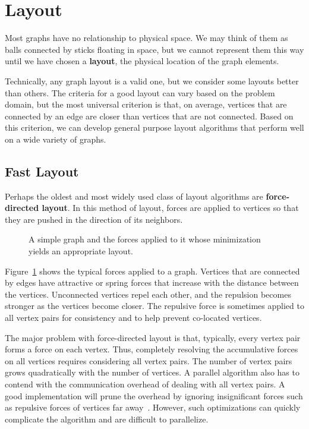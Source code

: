 \documentclass[pdf,12pt,report,strict]{SANDreport}
\newcommand*{\lcite}[1]{~\cite{#1}}
\newcommand*{\keyterm}[1]{\textbf{#1}}
\newcommand*{\keytermidx}[1]{\keyterm{#1}\index{#1}}
\begin{document}
\section{Layout}
\label{sec:Layout}


Most graphs have no relationship to physical space.  We may think of them
as balls connected by sticks floating in space, but we cannot represent
them this way until we have chosen a \keytermidx{layout}, the physical
location of the graph elements.

Technically, any graph layout is a valid one, but we consider some layouts
better than others.  The criteria for a good layout can vary based on the
problem domain, but the most universal criterion is that, on average,
vertices that are connected by an edge are closer than vertices that are
not connected.  Based on this criterion, we can develop general purpose
layout algorithms that perform well on a wide variety of graphs.

\subsection{Fast Layout}
\label{sec:Layout:FastLayout}


Perhaps the oldest and most widely used class of layout algorithms are
\keyterm{force-directed layout}.  In this
method of layout, forces are applied to vertices so that they are pushed in
the direction of its neighbors.

\begin{figure}
  \centering
  \caption[Forces on a simple graph.]{A simple graph and the forces applied
    to it whose minimization yields an appropriate layout.}
  \label{fig:GraphForces}
\end{figure}

Figure~\ref{fig:GraphForces} shows the typical forces applied to a graph.
Vertices that are connected by edges have attractive or spring forces that
increase with the distance between the vertices.  Unconnected vertices
repel each other, and the repulsion becomes stronger as the vertices become
closer.  The repulsive force is sometimes applied to all vertex pairs for
consistency and to help prevent co-located vertices.

The major problem with force-directed layout is that, typically, every
vertex pair forms a force on each vertex.  Thus, completely resolving the
accumulative forces on all vertices requires considering all vertex pairs.
The number of vertex pairs grows quadratically with the number of
vertices.  A parallel algorithm also has to contend with the communication
overhead of dealing with all vertex pairs.  A good implementation will
prune the overhead by ignoring insignificant forces such as repulsive
forces of vertices far away\lcite{Hachul04}.  However, such optimizations
can quickly complicate the algorithm and are difficult to parallelize.
\end{document}
